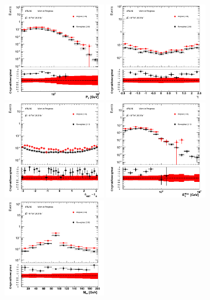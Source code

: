 
 \begin{figure}[htp]
 \centering
 \includegraphics[width=0.4\textwidth]{figures/ChargeMisID/Validation_ChargeMisIDRates_ZZ_PTLepton.png}
 \includegraphics[width=0.4\textwidth]{figures/ChargeMisID/Validation_ChargeMisIDRates_ZZ_EtaLepton.png}
 \includegraphics[width=0.4\textwidth]{figures/ChargeMisID/Validation_ChargeMisIDRates_ZZ_DeltaPhi.png}
 \includegraphics[width=0.4\textwidth]{figures/ChargeMisID/Validation_ChargeMisIDRates_ZZ_MET.png}
 \includegraphics[width=0.4\textwidth]{figures/ChargeMisID/Validation_ChargeMisIDRates_ZZ_Mee.png}

\end{figure}
